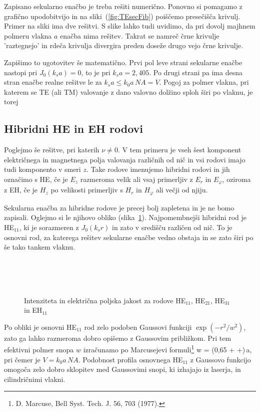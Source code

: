Zapisano sekularno enačbo je treba rešiti numerično. Ponovno si pomagamo z grafično upodobitvijo in 
na sliki~(\ref{fig:TEsecFib}) poiščemo presečišča krivulj. Primer na sliki ima dve rešitvi. S slike lahko 
tudi uvidimo, da pri dovolj majhnem polmeru vlakna $a$ enačba nima rešitev. Takrat se namreč
črne krivulje 'raztegnejo' in rdeča krivulja divergira preden doseže drugo vejo črne krivulje.

Zapišimo to ugotovitev še matematično. Prvi pol leve strani sekularne enačbe nastopi pri 
$J_0 (k_s a)  = 0$, to je pri $k_s a= 2,405$. 
Po drugi strani pa ima desna stran enačbe realne rešitve le za $k_s a \le k_0 a\,NA = V$.
Pogoj za polmer vlakna, pri katerem se TE (ali TM) valovanje z dano valovno dolžino sploh širi po 
vlaknu, je torej 

\subsection*{Hibridni HE in EH rodovi}
Poglejmo še rešitve, pri katerih $\nu \neq 0$. V tem primeru je 
vseh šest komponent električnega in magnetnega polja valovanja različnih od nič in vsi rodovi
imajo tudi komponento v smeri $z$. Take rodove imenujemo hibridni rodovi in jih 
označimo s HE, če je $E_z$ razmeroma velik ali vsaj primerljiv z $E_r$ in $E_\varphi$, 
oziroma z EH, če je $H_z$ po velikosti primerljiv s $H_r$ in $H_\varphi$ ali večji od njiju. 

Sekularna enačba za hibridne rodove je precej bolj zapletena in je ne bomo zapisali. 
Oglejmo si le njihovo obliko (slika~\ref{fig:HE11}). Najpomembnejši hibridni rod je HE$_{11}$, 
ki je sorazmeren z $J_0(k_sr)$ in zato v središču različen od nič. 
To je osnovni rod, za katerega rešitev sekularne enačbe vedno obstaja in se
zato širi po še tako tankem vlaknu. 
\begin{figure}[h]
\centering
\def\svgwidth{85truemm} 
\\
\def\svgwidth{85truemm} 
 \\
\def\svgwidth{85truemm} 
 \\
\def\svgwidth{85truemm} 

\caption{Intenziteta in električna poljska jakost za rodove
HE$_{11}$, HE$_{21}$, HE$_{31}$ in EH$_{11}$}
\label{fig:HE11}
\end{figure}

Po obliki je osnovni HE$_{11}$ rod zelo podoben Gaussovi funkciji $\exp(-r^2/w^2)$,
zato ga lahko razmeroma dobro opišemo z Gaussovim približkom. 
Pri tem efektivni polmer snopa
$w$ izračunamo po Marcusejevi
 formuli\footnote{D. Marcuse, Bell Syst. Tech. J. 56, 703 (1977).}
\beq 
w = (0,65 + +)\,a,
\label{Marcuse}
\eeq
pri čemer je $V = k_0 a\,NA $. Podobnost profila osnovnega
HE$_{11}$ z Gaussovo funkcijo omogoča zelo dobro sklopitev med Gaussovimi
snopi, ki izhajajo iz laserja, in cilindričnimi vlakni.


